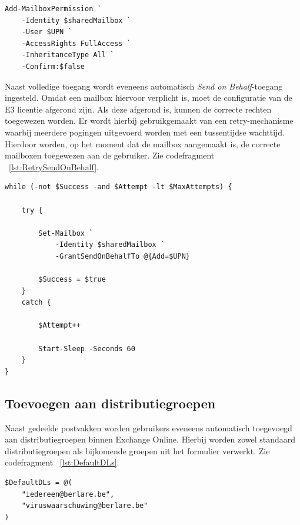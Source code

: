\begin{listing}[ht]
\begin{verbatim}
Add-MailboxPermission `
    -Identity $sharedMailbox `
    -User $UPN `
    -AccessRights FullAccess `
    -InheritanceType All `
    -Confirm:$false
\end{verbatim}
\caption{Toekennen van mailboxrechten}
\label{lst:MailboxPermissions}
\end{listing}

Naast volledige toegang wordt eveneens automatisch \textit{Send on Behalf}-toegang ingesteld. Omdat een mailbox hiervoor verplicht is, moet de configuratie van de E3 licentie afgerond zijn. Als deze afgerond is, kunnen de correcte rechten toegewezen worden. Er wordt hierbij gebruikgemaakt van een retry-mechanisme waarbij meerdere pogingen uitgevoerd worden met een tussentijdse wachttijd. Hierdoor worden, op het moment dat de mailbox aangemaakt is, de correcte mailboxen toegewezen aan de gebruiker. Zie codefragment ~\ref{lst:RetrySendOnBehalf}.

\begin{listing}[ht]
\begin{verbatim}
while (-not $Success -and $Attempt -lt $MaxAttempts) {

    try {

        Set-Mailbox `
            -Identity $sharedMailbox `
            -GrantSendOnBehalfTo @{Add=$UPN}

        $Success = $true
    }
    catch {

        $Attempt++

        Start-Sleep -Seconds 60
    }
}
\end{verbatim}
\caption{Retry-mechanisme voor Send on Behalf}
\label{lst:RetrySendOnBehalf}
\end{listing}

\subsection{Toevoegen aan distributiegroepen}

Naast gedeelde postvakken worden gebruikers eveneens automatisch toegevoegd aan distributiegroepen binnen Exchange Online. Hierbij worden zowel standaard distributiegroepen als bijkomende groepen uit het formulier verwerkt. Zie codefragment ~\ref{lst:DefaultDLs}.

\begin{listing}[ht]
\begin{verbatim}
$DefaultDLs = @(
    "iedereen@berlare.be",
    "viruswaarschuwing@berlare.be"
)
\end{verbatim}
\caption{Standaard distributiegroepen}
\label{lst:DefaultDLs}
\end{listing}

